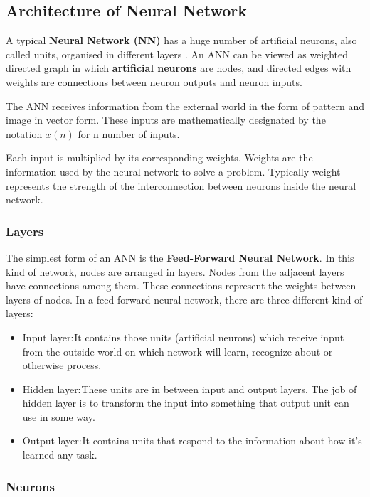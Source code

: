 \subsection{Architecture of Neural Network}

A typical \textbf{Neural Network (NN)} has a huge number of artificial neurons, also called units, organised in different layers \cite{ArtificialApplications}. An ANN can be viewed as weighted directed graph in which \textbf{artificial neurons} are nodes, and directed edges with weights are connections between neuron outputs and neuron inputs.

The ANN receives information from the external world in the form of pattern and image in vector form. These inputs are mathematically designated by the notation $x(n)$ for n number of inputs.

Each input is multiplied by its corresponding weights. Weights are the information used by the neural network to solve a problem. Typically weight represents the strength of the interconnection between neurons inside the neural network.

\subsubsection{Layers}

The simplest form of an ANN is the \textbf{Feed-Forward Neural Network}. 
In this kind of network, nodes are arranged in layers. Nodes from the adjacent layers have connections among them. These connections represent the weights between layers of nodes. In a feed-forward neural network, there are three different kind of layers:
\begin{itemize}
	\item 
Input layer: It contains those units (artificial neurons) which receive input from the outside world on which network will learn, recognize about or otherwise process.
	\item 
Hidden layer: These units are in between input and output layers. The job of hidden layer is to transform the input into something that output unit can use in some way.
	\item 
Output layer: It contains units that respond to the information about how it’s learned any task.
\end{itemize}



\subsubsection{Neurons}

